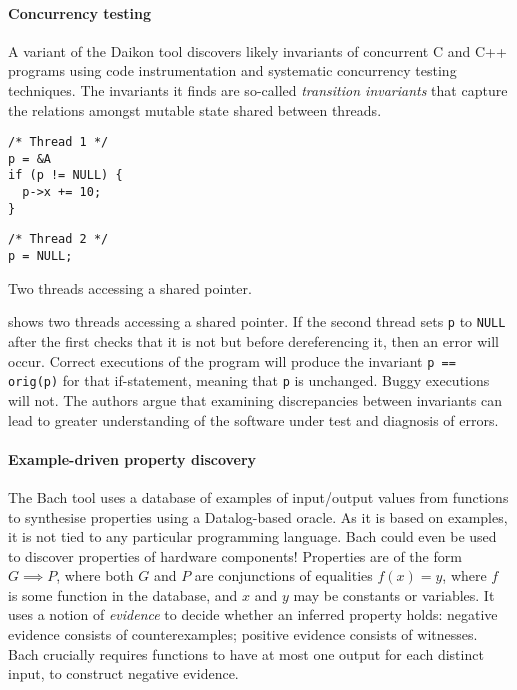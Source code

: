 \paragraph{Concurrency testing}
A variant of the Daikon tool discovers likely invariants of concurrent
C and C++ programs using code instrumentation and systematic
concurrency testing techniques\cite{kusano2015}.  The invariants it
finds are so-called \emph{transition invariants} that capture the
relations amongst mutable state shared between threads.

\begin{listing}
\centering
\begin{minipage}[t]{0.3\textwidth}
\begin{verbatim}
/* Thread 1 */
p = &A
if (p != NULL) {
  p->x += 10;
}
\end{verbatim}
\end{minipage}
\begin{minipage}[t]{0.3\textwidth}
\begin{verbatim}
/* Thread 2 */
p = NULL;
\end{verbatim}
\end{minipage}
\caption{Two threads accessing a shared pointer.}\label{lst:cthreads}
\end{listing}

 shows two threads accessing a shared pointer.  If
the second thread sets \verb|p| to \verb|NULL| after the first checks
that it is not but before dereferencing it, then an error will occur.
Correct executions of the program will produce the invariant
\verb|p == orig(p)| for that if-statement, meaning that \verb|p| is
unchanged.  Buggy executions will not.  The authors argue that
examining discrepancies between invariants can lead to greater
understanding of the software under test and diagnosis of errors.

\paragraph{Example-driven property discovery}
The Bach\cite{smith2017} tool uses a database of examples of
input/output values from functions to synthesise properties using a
Datalog-based oracle.  As it is based on examples, it is not tied to
any particular programming language.  Bach could even be used to
discover properties of hardware components!  Properties are of the
form $G \implies P$, where both $G$ and $P$ are conjunctions of
equalities $f(x) = y$, where $f$ is some function in the database, and
$x$ and $y$ may be constants or variables.  It uses a notion of
\emph{evidence} to decide whether an inferred property holds: negative
evidence consists of counterexamples; positive evidence consists of
witnesses.  Bach crucially requires functions to have at most one
output for each distinct input, to construct negative evidence.

